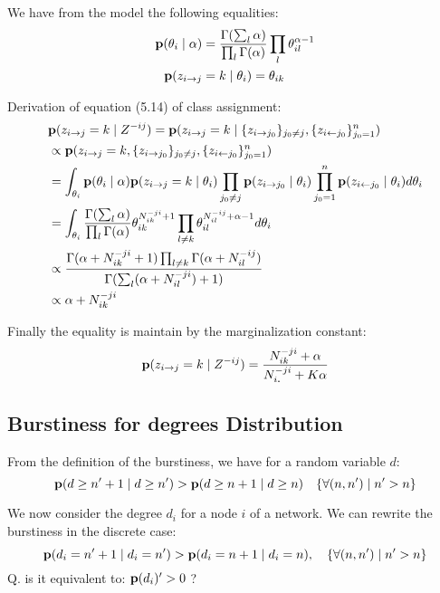 We have from the model the following equalities:
\begin{align}
\mathbf{p}(\theta_i \mid \alpha) &= \frac{\Gamma(\sum_l \alpha)}{\prod_l \Gamma(\alpha)} \prod_l \theta_{il}^{\alpha-1} \\
\mathbf{p}(z_{i\rightarrow j} &= k \mid \theta_i) = \theta_{ik}
\end{align}

Derivation of equation (5.14) of class assignment:
\begin{align}
&\mathbf{p}(z_{i\rightarrow j}=k \mid Z^{-ij}) = \mathbf{p}(z_{i\rightarrow j}=k \mid \{z_{i\rightarrow j_0}\}_{j_0\neq j},\{z_{i\leftarrow j_0}\}_{j_0= 1}^n )\\
&\propto \mathbf{p}(z_{i\rightarrow j}= k,\{z_{i\rightarrow j_0}\}_{j_0\neq j},\{z_{i\leftarrow j_0}\}_{j_0= 1}^n ) \\
&= \int_{\theta_i} \mathbf{p}(\theta_i \mid \alpha) \mathbf{p}(z_{i\rightarrow j}=k \mid \theta_i) \prod_{j_0\neq j} \mathbf{p}(z_{i\rightarrow j_0} \mid \theta_i) \prod_{j_0 =  1}^n  \mathbf{p}(z_{i\leftarrow j_0} \mid \theta_i)  d\theta_i \\
&=\int_{\theta_i} \frac{\Gamma(\sum_l \alpha)}{\prod_l \Gamma(\alpha)}\theta_{ik}^{N_{ik}^{-ji}+1} \prod_{l\neq k} \theta_{il}^{N_{il}^{-ij} +\alpha-1} d\theta_i \\
&\propto \frac{\Gamma(\alpha + N_{ik}^{-ji}+1)\prod_{l\neq k} \Gamma(\alpha + N_{il}^{-ij})}{\Gamma(\sum_l( \alpha + N_{il}^{-ji}) +1)} \\
&\propto \alpha + N_{ik}^{-ji}
\end{align}

Finally the equality is maintain by the marginalization constant:
\begin{equation}
\mathbf{p}(z_{i\rightarrow j}=k \mid Z^{-ij}) =\frac{ N_{ik}^{-ji} + \alpha}{ N_{i\bm{.}}^{-ji} + K\alpha }
\end{equation}

\subsection{Burstiness for degrees Distribution}
\label{burst_proof}

From the definition of the burstiness, we have for a random variable $d$:
\begin{equation}
	\mathbf{p}(d \geq n'+1 \mid d \geq n') > \mathbf{p}(d \geq n+1 \mid d \geq n) \quad \{\forall (n,n') \mid  n' > n \}
\end{equation}

We now consider the degree $d_i$ for a node $i$ of a network. We can rewrite the burstiness in the discrete case:
\begin{equation}
\mathbf{p}(d_i = n'+1 \mid d_i = n') > \mathbf{p}(d_i = n+1 \mid d_i = n), \quad \{\forall (n,n') \mid  n' > n \}
\end{equation}
\hspace{0.35\textwidth} Q. is it equivalent to: $\mathbf{p}(d_i)' > 0$ ?\\

